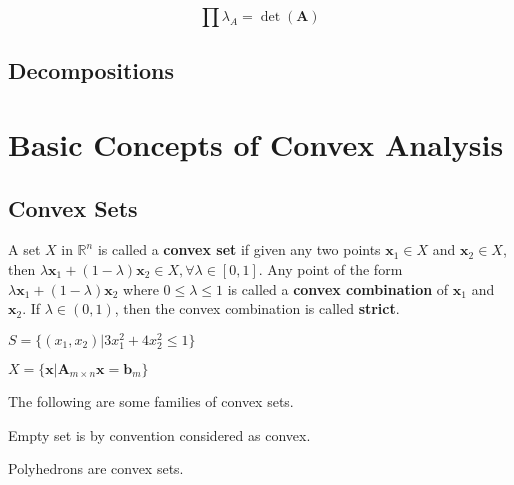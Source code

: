 				\begin{corollary}
					\begin{equation}
						\prod \lambda_A = \det(\mathbf{A})
					\end{equation}
				\end{corollary}


			\section{Decompositions}

		\chapter{Basic Concepts of Convex Analysis}
			\section{Convex Sets}
				\begin{definition}
					A set $X$ in $\mathbb{R}^n$ is called a \textbf{convex set} if given any two points $\mathbf{x}_1 \in X$ and $\mathbf{x}_2 \in X$, then $\lambda \mathbf{x}_1 + (1 - \lambda) \mathbf{x}_2 \in X, \forall \lambda \in [0, 1]$. Any point of the form $\lambda \mathbf{x}_1 + (1 - \lambda) \mathbf{x}_2$ where $0 \le \lambda \le 1$ is called a \textbf{convex combination} of $\mathbf{x}_1$ and $\mathbf{x}_2$. If $\lambda \in (0, 1)$, then the convex combination is called \textbf{strict}.
				\end{definition}

				\begin{example}
					$S = \{(x_1, x_2) | 3x_1^2 + 4x_2^2 \le 1\}$
				\end{example}

				\begin{example}
					$X = \{\mathbf{x} | \mathbf{A}_{m\times n} \mathbf{x} = \mathbf{b}_m\}$
				\end{example}

				The following are some families of convex sets.

				\begin{example}
					Empty set is by convention considered as convex.
				\end{example}

				\begin{example}
					Polyhedrons are convex sets.
				\end{example}


